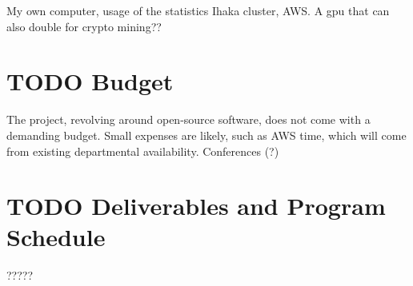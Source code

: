 \documentclass[a4paper,10pt]{article}
\begin{document}
My own computer, usage of the statistics Ihaka cluster, AWS.
A gpu that can also double for crypto mining??

\section{TODO Budget}

The project, revolving around open-source software, does not come with a demanding budget.
Small expenses are likely, such as AWS time, which will come from existing departmental availability.
Conferences (?)

\section{TODO Deliverables and Program Schedule}

?????

\printbibliography
\end{document}
